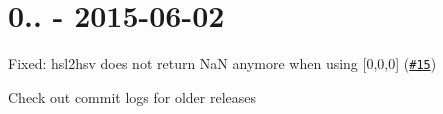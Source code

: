 \section*{0.. -\/ 2015-\/06-\/02}


\begin{DoxyItemize}
\item Fixed\+: hsl2hsv does not return {\ttfamily NaN} anymore when using {\ttfamily \mbox{[}0,0,0\mbox{]}} (\href{https://github.com/harthur/color-convert/issues/15}{\tt \#15}) 


\end{DoxyItemize}

Check out commit logs for older releases 